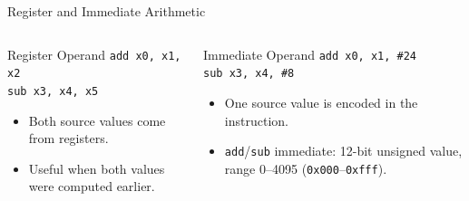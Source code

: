 \documentclass[aspectratio=169,11pt,t]{beamer}
\newcommand{\code}[1]{\texttt{#1}}
\begin{document}









\begin{frame}{Register and Immediate Arithmetic}
\begin{columns}[T,onlytextwidth]
\begin{block}{Register Operand}
\large
\hspace{1.1cm}\code{add x0, x1, x2}\\[0.12cm]
\hspace{1.1cm}\code{sub x3, x4, x5}
\normalsize
\begin{itemize}
\item Both source values come from registers.
\item Useful when both values were computed earlier.
\end{itemize}
\end{block}
\begin{block}{Immediate Operand}
\large
\hspace{1.0cm}\code{add x0, x1, \#24}\\[0.12cm]
\hspace{1.0cm}\code{sub x3, x4, \#8}
\normalsize
\begin{itemize}
\item One source value is encoded in the instruction.
\item \code{add}/\code{sub} immediate: 12-bit unsigned value, range 0--4095 (\code{0x000}--\code{0xfff}).
\end{itemize}
\end{block}
\end{columns}
\end{frame}

\end{document}
